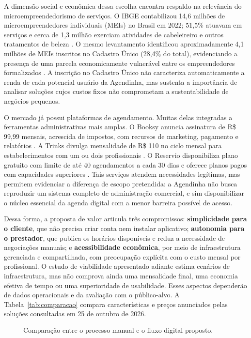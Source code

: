 A dimensão social e econômica dessa escolha encontra respaldo na relevância do microempreendedorismo de serviços. O IBGE contabilizou 14,6 milhões de microempreendedores individuais (MEIs) no Brasil em 2022; 51,5\% atuavam em serviços e cerca de 1,3 milhão exerciam atividades de cabeleireiro e outros tratamentos de beleza \cite{ibgemei}. O mesmo levantamento identificou aproximadamente 4,1 milhões de MEIs inscritos no Cadastro Único (28,4\% do total), evidenciando a presença de uma parcela economicamente vulnerável entre os empreendedores formalizados \cite{ibgemei}. A inscrição no Cadastro Único não caracteriza automaticamente a renda de cada potencial usuário da Agendinha, mas sustenta a importância de analisar soluções cujos custos fixos não comprometam a sustentabilidade de negócios pequenos.

O mercado já possui plataformas de agendamento. Muitas delas integradas a ferramentas administrativas mais amplas. O Booksy anuncia assinatura de R\$ 99,99 mensais, acrescida de impostos, com recursos de marketing, pagamento e relatórios \cite{booksypricing}. A Trinks divulga mensalidade de R\$ 110 no ciclo mensal para estabelecimentos com um ou dois profissionais \cite{trinkspricing}. O Reservio disponibiliza plano gratuito com limite de até 40 agendamentos a cada 30 dias e oferece planos pagos com capacidades superiores \cite{reserviopricing}. Tais serviços atendem necessidades legítimas, mas permitem evidenciar a diferença de escopo pretendida: a Agendinha não busca reproduzir um sistema completo de administração comercial, e sim disponibilizar o núcleo essencial da agenda digital com a menor barreira possível de acesso.

Dessa forma, a proposta de valor articula três compromissos: \textbf{simplicidade para o cliente}, que não precisa criar conta nem instalar aplicativo; \textbf{autonomia para o prestador}, que publica os horários disponíveis e reduz a necessidade de negociações manuais; e \textbf{acessibilidade econômica}, por meio de infraestrutura gerenciada e compartilhada, com preocupação explícita com o custo mensal por profissional. O estudo de viabilidade apresentado adiante estima cenários de infraestrutura, mas não comprova ainda uma mensalidade final, uma economia efetiva de tempo ou uma superioridade de usabilidade. Esses aspectos dependerão de dados operacionais e da avaliação com o público-alvo. A Tabela~\ref{tab:comparacao} compara características e preços anunciados pelas soluções consultadas em 25 de outubro de 2026.

\begin{figure}[H]
    \centering
    \resizebox{0.95\textwidth}{!}{}
    \caption{Comparação entre o processo manual e o fluxo digital proposto.}
    \label{fig:processo}
    \fontepropria
\end{figure}

